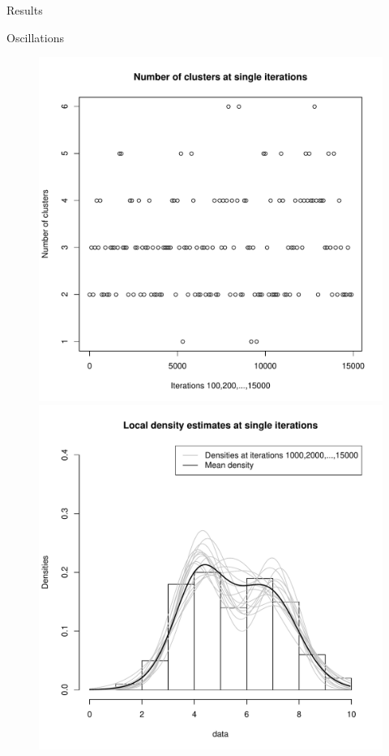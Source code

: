 \begin{frame}[c]
	\begin{center}
		\huge \color{blue} Results
	\end{center}
\end{frame}



\begin{frame}{Oscillations}
\begin{figure}[h]
	\centering
	\begin{minipage}{0.5\textwidth}
		\includegraphics[scale=0.35]{etc/cardinalities_thinned.pdf}
	\end{minipage}%
	\begin{minipage}{0.5\textwidth}
		\includegraphics[scale=0.35]{etc/densities_iters.pdf}
	\end{minipage}
\end{figure}


\end{frame}
